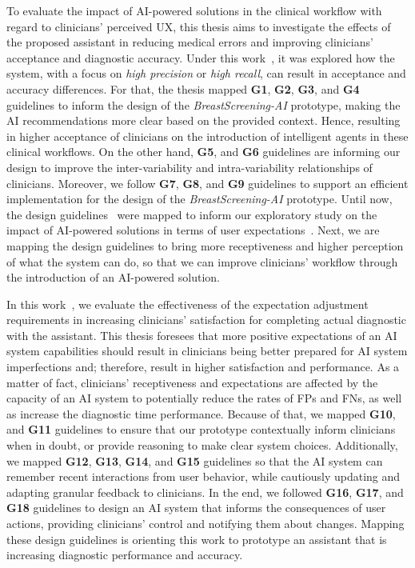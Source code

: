 

To evaluate the impact of \ac{AI}-powered solutions in the clinical workflow with regard to clinicians' perceived \ac{UX}, this thesis aims to investigate the effects of the proposed assistant in reducing medical errors and improving clinicians' acceptance and diagnostic accuracy.
Under this work~\cite{CALISTO2022102285}, it was explored how the system, with a focus on {\it high precision} or {\it high recall}, can result in acceptance and accuracy differences.
For that, the thesis mapped {\bf G1}, {\bf G2}, {\bf G3}, and {\bf G4} guidelines to inform the design of the {\it BreastScreening-AI} prototype, making the \ac{AI} recommendations more clear based on the provided context.
Hence, resulting in higher acceptance of clinicians on the introduction of intelligent agents in these clinical workflows.
On the other hand, {\bf G5}, and {\bf G6} guidelines are informing our design to improve the inter-variability and intra-variability relationships of clinicians.
Moreover, we follow {\bf G7}, {\bf G8}, and {\bf G9} guidelines to support an efficient implementation for the design of the {\it BreastScreening-AI} prototype.
Until now, the design guidelines~\cite{10.1145/3290605.3300233} were mapped to inform our exploratory study on the impact of  \ac{AI}-powered solutions in terms of user expectations~\cite{Kocielnik:2019:YAI:3290605.3300641}.
Next, we are mapping the design guidelines to bring more receptiveness and higher perception of what the system can do, so that we can improve clinicians' workflow through the introduction of an \ac{AI}-powered solution.

In this work~\cite{CALISTO2022102285}, we evaluate the effectiveness of the expectation adjustment requirements in increasing clinicians' satisfaction for completing actual diagnostic with the assistant.
This thesis foresees that more positive expectations of an \ac{AI} system capabilities should result in clinicians being better prepared for \ac{AI} system imperfections and; therefore, result in higher satisfaction and performance.
As a matter of fact, clinicians' receptiveness and expectations are affected by the capacity of an \ac{AI} system to potentially reduce the rates of \acp{FP} and \acp{FN}, as well as increase the diagnostic time performance.
Because of that, we mapped {\bf G10}, and {\bf G11} guidelines to ensure that our prototype contextually inform clinicians when in doubt, or provide reasoning to make clear system choices.
Additionally, we mapped {\bf G12}, {\bf G13}, {\bf G14}, and {\bf G15} guidelines so that the \ac{AI} system can remember recent interactions from user behavior, while cautiously updating and adapting granular feedback to clinicians.
In the end, we followed {\bf G16}, {\bf G17}, and {\bf G18} guidelines to design an \ac{AI} system that informs the consequences of user actions, providing clinicians' control and notifying them about changes.
Mapping these design guidelines is orienting this work to prototype an assistant that is increasing diagnostic performance and accuracy.

